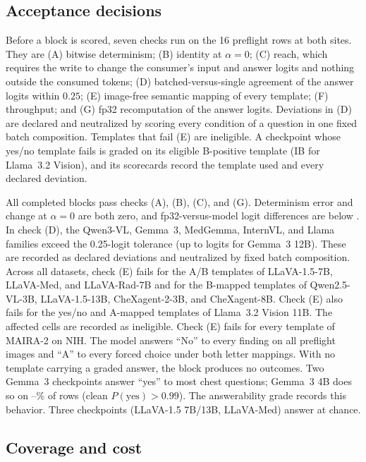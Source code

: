 \documentclass[11pt]{article}
\begin{document}
\subsection{Acceptance decisions}
\label{app:cf-gates}

Before a block is scored, seven checks run on the 16 preflight rows at both sites. They are (A) bitwise determinism; (B) identity at $\alpha=0$; (C) reach, which requires the write to change the consumer's input and answer logits and nothing outside the consumed tokens; (D) batched-versus-single agreement of the answer logits within $0.25$; (E) image-free semantic mapping of every template; (F) throughput; and (G) fp32 recomputation of the answer logits. Deviations in (D) are declared and neutralized by scoring every condition of a question in one fixed batch composition. Templates that fail (E) are ineligible. A checkpoint whose yes/no template fails is graded on its eligible B-positive template (IB for Llama~3.2 Vision), and its scorecards record the template used and every declared deviation.

All \cfWriteBlocks{} completed blocks pass checks (A), (B), (C), and (G). Determinism error and change at $\alpha=0$ are both zero, and fp32-versus-model logit differences are below \cfGateFpMax{}. In check (D), the Qwen3-VL, Gemma~3, MedGemma, InternVL, and Llama families exceed the 0.25-logit tolerance (up to \cfGateBatchMax{} logits for Gemma~3 12B). These are recorded as declared deviations and neutralized by fixed batch composition. Across all datasets, check (E) fails for the A/B templates of LLaVA-1.5-7B, LLaVA-Med, and LLaVA-Rad-7B and for the B-mapped templates of Qwen2.5-VL-3B, LLaVA-1.5-13B, CheXagent-2-3B, and CheXagent-8B. Check (E) also fails for the yes/no and A-mapped templates of Llama~3.2 Vision 11B. The affected cells are recorded as ineligible. Check (E) fails for every template of MAIRA-2 \citep{bannur2024maira} on NIH. The model answers ``No'' to every finding on all \cfSpecUngradedRows{} preflight images and ``A'' to every forced choice under both letter mappings. With no template carrying a graded answer, the block produces no outcomes. Two Gemma~3 checkpoints answer ``yes'' to most chest questions; Gemma~3 4B does so on \cfGemmaFourYesMin--\cfGemmaFourYesMax\% of rows (clean $P(\mathrm{yes})>0.99$). The answerability grade records this behavior. Three checkpoints (LLaVA-1.5 7B/13B, LLaVA-Med) answer at chance.

\subsection{Coverage and cost}
\label{app:cf-coverage}
\end{document}
